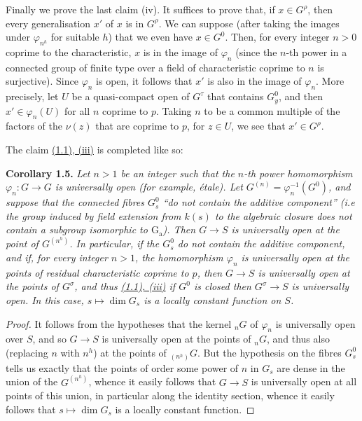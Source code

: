 \documentclass{article}
\newenvironment{itenv}[1]
  {\phantomsection\par\smallskip\noindent\textbf{#1.}\itshape}
  {\par\smallskip}
\newcommand{\oldpage}[1]{\marginpar{\footnotesize$\Big\vert$ \textit{p.~#1}}}
\theoremstyle{definition}
\theoremstyle{definition}
\theoremstyle{definition}
\theoremstyle{definition}
\theoremstyle{remark}
\begin{document}
Finally we prove the last claim (iv).
It suffices to prove that, if \(x\in G^\rho\), then every generalisation \(x'\) of \(x\) is in \(G^\rho\).
We can suppose (after taking the images under \(\varphi_{n^h}\) for suitable \(h\)) that we even have \(x\in G^0\).
Then, for every integer \(n>0\) coprime to the characteristic, \(x\) is in the image of \(\varphi_n\) (since the \(n\)-th power in a connected group of finite type over a field of characteristic coprime to \(n\) is surjective).
Since \(\varphi_n\) is open, it follows that \(x'\) is also in the image of \(\varphi_n\).
More precisely, let \(U\) be a quasi-compact open of \(G^\tau\) that contains \(G_y^0\), and then \(x'\in\varphi_n(U)\) for all \(n\) coprime to \(p\).
Taking \(n\) to be a common multiple of the factors of the \(\nu(z)\) that are coprime to \(p\), for \(z\in U\), we see that \(x'\in G^\rho\).

The claim \protect\hyperlink{fga-3-vi-theorem-1.1}{(1.1), (iii)} is completed like so:

\leavevmode{}%
\begin{itenv}{Corollary 1.5}
Let \(n>1\) be an integer such that the \(n\)-th power homomorphism \(\varphi_n\colon G\to G\) is universally open (for example, étale).
Let \(G^{(n)}=\varphi_n^{-1}(G^0)\), and suppose that the connected fibres \(G_s^0\) ``do not contain the additive component'' (i.e the group induced by field extension from \(k(s)\) to the algebraic closure does not contain a subgroup isomorphic to \(\operatorname{G_a}\)).
\oldpage{236-08}Then \(G\to S\) is universally open at the point of \(G^{(n^h)}\).
In particular, if the \(G_s^0\) do not contain the additive component, and if, for every integer \(n>1\), the homomorphism \(\varphi_n\) is universally open at the points of residual characteristic coprime to \(p\), then \(G\to S\) is universally open at the points of \(G^\sigma\), and thus \protect\hyperlink{fga-3-vi-theorem-1.1}{(1.1), (iii)} if \(G^0\) is closed then \(G^\sigma\to S\) is universally open.
In this case, \(s\mapsto\dim G_s\) is a locally constant function on \(S\).

\end{itenv}

\begin{proof}
It follows from the hypotheses that the kernel \({}_nG\) of \(\varphi_n\) is universally open over \(S\), and so \(G\to S\) is universally open at the points of \({}_nG\), and thus also (replacing \(n\) with \(n^h\)) at the points of \({}_{(n^h)}G\).
But the hypothesis on the fibres \(G_s^0\) tells us exactly that the points of order some power of \(n\) in \(G_s\) are dense in the union of the \(G^{(n^h)}\), whence it easily follows that \(G\to S\) is universally open at all points of this union, in particular along the identity section, whence it easily follows that \(s\mapsto\dim G_s\) is a locally constant function.
\end{proof}
\end{document}

